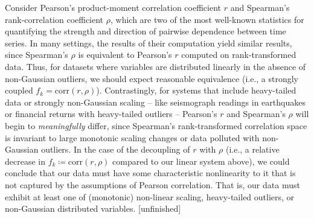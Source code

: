 Consider Pearson’s product-moment correlation coefficient $r$ and Spearman's rank-correlation coefficient $\rho$, which are two of the most well-known statistics for quantifying the strength and direction of pairwise dependence between time series. In many settings, the results of their computation yield similar results, since Spearman's $\rho$ is equivalent to Pearson’s $r$ computed on rank-transformed data. Thus, for datasets where variables are distributed linearly in the absence of non-Gaussian outliers, we should expect reasonable equivalence (i.e., a strongly coupled $f_k = \mathrm{corr}(r, \rho)$). Contrastingly, for systems that include heavy-tailed data or strongly non-Gaussian scaling -- like seismograph readings in earthquakes or financial returns with heavy-tailed outliers -- Pearson’s $r$ and Spearman’s $\rho$ will begin to \textit{meaningfully} differ, since Spearman’s rank-transformed correlation space is invariant to large monotonic scaling changes or data polluted with non-Gaussian outliers. In the case of the decoupling of $r$ with $\rho$ (i.e., a relative decrease in $f_k \coloneqq \mathrm{corr}(r, \rho)$ compared to our linear system above), we could conclude that our data must have some characteristic nonlinearity to it that is not captured by the assumptions of Pearson correlation. That is, our data must exhibit at least one of (monotonic) non-linear scaling, heavy-tailed outliers, or non-Gaussian distributed variables. [unfinished]